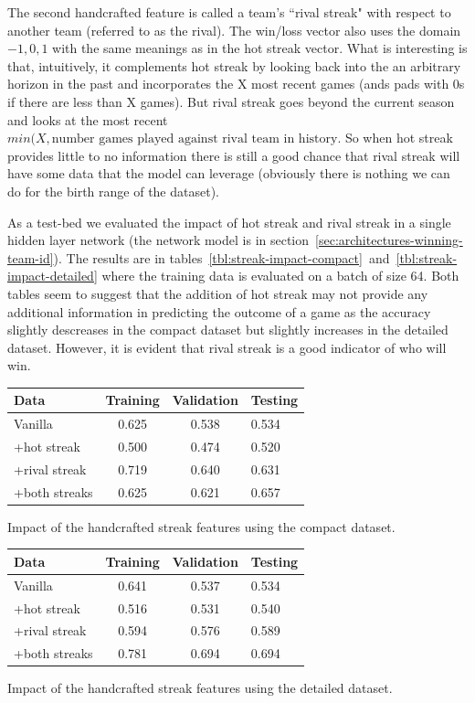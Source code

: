 \documentclass{article} %
\begin{document}
\begin{enumerate}
The second handcrafted feature is called a team's ``rival streak" with respect to another team (referred to as the rival). The win/loss vector also uses the domain ${-1, 0, 1}$ with the same meanings as in the hot streak vector.  What is interesting is that, intuitively, it complements hot streak by looking back into the an arbitrary horizon in the past and incorporates the X most recent games (ands pads with 0s if there are less than X games).  But rival streak goes beyond the current season and looks at the most recent $min(X, \text{number games played against rival team in history}$.  So when hot streak provides little to no information there is still a good chance that rival streak will have some data that the model can leverage (obviously there is nothing we can do for the birth range of the dataset).

As a test-bed we evaluated the impact of hot streak and rival streak in a single hidden layer network (the network model is in section~\ref{sec:architectures-winning-team-id}).  The results are in tables~\ref{tbl:streak-impact-compact}~and~\ref{tbl:streak-impact-detailed} where the training data is evaluated on a batch of size 64.  Both tables seem to suggest that the addition of hot streak may not provide any additional information in predicting the outcome of a game as the accuracy slightly descreases in the compact dataset but slightly increases in the detailed dataset.  However, it is evident that rival streak is a good indicator of who will win.


\begin{tabular}{|l|c|c|}
\hline
Data & Training & Validation & Testing\\
\hline
Vanilla & 0.625 & 0.538 & 0.534\\
+hot streak & 0.500 & 0.474 & 0.520\\
+rival streak & 0.719 & 0.640 & 0.631\\
+both streaks & 0.625 & 0.621 & 0.657\\
\end{tabular}
\caption{Impact of the handcrafted streak features using the compact dataset.}
\label{tbl:streak-impact-detaled}


\begin{tabular}{|l|c|c|}
\hline
Data & Training & Validation & Testing\\
\hline
Vanilla & 0.641 & 0.537 & 0.534\\
+hot streak & 0.516 & 0.531 & 0.540\\
+rival streak & 0.594 & 0.576 & 0.589\\
+both streaks & 0.781 & 0.694 & 0.694\\
\end{tabular}
\caption{Impact of the handcrafted streak features using the detailed dataset.}
\label{tbl:streak-impact-detaled}




\end{enumerate}
\end{document}
